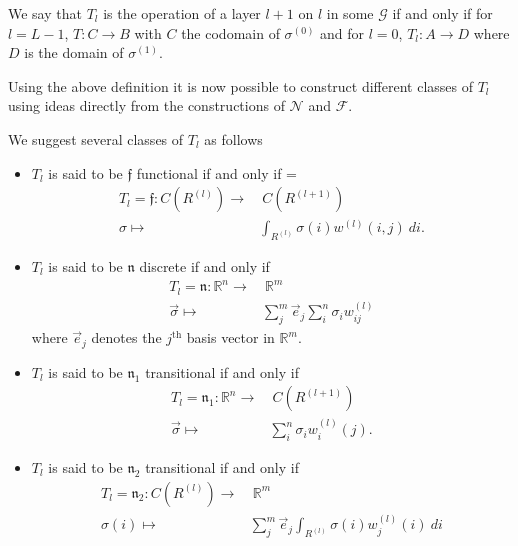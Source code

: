 \begin{definition}
We say that $T_l$ is the operation of a layer $l+1$ on $l$ in some $\mathcal{G}$ if and only if for $l=L-1$, $T:C\to B$ with $C$ the codomain of $\sigma^{(0)}$ and for $l = 0$, $T_l : A\to D$ where $D$ is the domain of $\sigma^{(1)}.$
\end{definition}

Using the above definition it is now possible to construct different classes of $T_l$ using ideas directly from the constructions of $\mathcal{N}$ and $\mathcal{F}$.

\begin{definition}
We suggest several classes of $T_l$ as follows
	\begin{itemize}
	\item $T_l$ is said to be $\mathfrak{f}$ functional if and only if 
	 =	\begin{equation} \label{eq:tlfunctional}
		\begin{aligned} 
			T_l = \mathfrak{f}: C(R^{(l)}) \to&\ C(R^{(l+1)}) \\
			\sigma \mapsto& \int_{R^{(l)}} \sigma(i) w^{(l)}(i,j)\ di.
		\end{aligned}
		\end{equation}
	\item $T_l$ is said to be $\mathfrak{n}$ discrete if and only if 
		\begin{equation} \label{eq:tldiscrete}
		\begin{aligned} 
			T_l = \mathfrak{n}: \mathbb{R}^n \to&\ \mathbb{R}^m \\
			\vec{\sigma} \mapsto& \sum_j^m \vec{e}_j\sum_i^n \sigma_i w^{(l)}_{ij}
		\end{aligned}
		\end{equation}
		where $\vec{e}_j$ denotes the $j^\mathrm{th}$ basis vector in $\mathbb{R}^m$.
	\item $T_l$ is said to be $\mathfrak{n}_1$ transitional if and only if 
		\begin{equation} \label{eq:tldiscrete}
		\begin{aligned} 
			T_l = \mathfrak{n}_1: \mathbb{R}^n \to&\  C(R^{(l+1)}) \\
			\vec{\sigma} \mapsto& \sum_i^n \sigma_i w^{(l)}_i(j).
		\end{aligned}
		\end{equation}
	\item $T_l$ is said to be $\mathfrak{n}_2$ transitional if and only if 
		\begin{equation} \label{eq:tldiscrete}
		\begin{aligned} 
			T_l = \mathfrak{n}_2: C(R^{(l)}) \to&\ \mathbb{R}^m \\
			\sigma(i) \mapsto& \sum_j^m \vec{e}_j\int_{R^{(l)}} \sigma(i) w^{(l)}_j(i)\ di
		\end{aligned}
		\end{equation}
	\end{itemize}
\end{definition}

